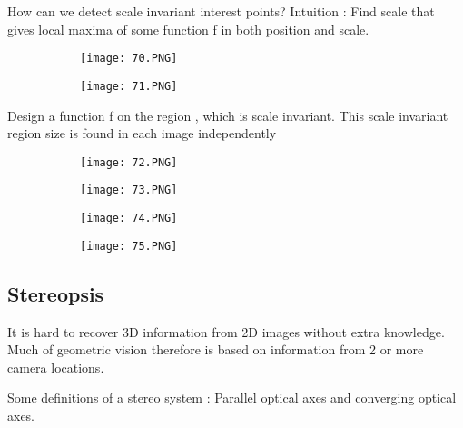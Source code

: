 \documentclass{article}
\begin{document}
How can we detect scale invariant interest points?
Intuition : Find scale that gives local maxima of some function f in both position and scale.

\begin{figure}[ht!]
  \centering
  \begin{subfigure}[b]{0.4\linewidth}
    \texttt{[image: 70.PNG]}
  \end{subfigure}
  \begin{subfigure}[b]{0.4\textwidth}
         \centering
         \texttt{[image: 71.PNG]}
     \end{subfigure}
\end{figure}


Design a function f on the region , which is scale invariant.
This scale invariant region size is found in each image independently

\begin{figure}[ht!]
  \centering
  \begin{subfigure}[b]{0.4\linewidth}
    \texttt{[image: 72.PNG]}
  \end{subfigure}
  \begin{subfigure}[b]{0.4\textwidth}
         \centering
         \texttt{[image: 73.PNG]}
     \end{subfigure}
\end{figure}

\begin{figure}[ht!]
  \centering
  \begin{subfigure}[b]{0.4\linewidth}
    \texttt{[image: 74.PNG]}
  \end{subfigure}
  \begin{subfigure}[b]{0.4\textwidth}
         \centering
         \texttt{[image: 75.PNG]}
     \end{subfigure}
\end{figure}

\subsection{Stereopsis}

It is hard to recover 3D information from 2D images without extra knowledge.
Much of geometric vision therefore is based on information from 2 or more camera locations.

Some definitions of a stereo system : Parallel optical axes and converging optical axes.
\end{document}
